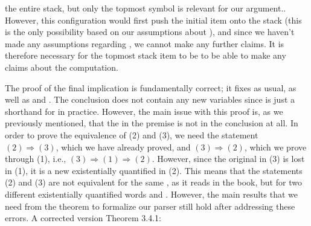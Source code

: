 \begin{isabellebody}
\begin{isamarkuptext}
{the entire stack, but only the topmost symbol is relevant for our argument.}. However, this 
configuration would first push the initial item  onto the stack (this is the 
only possibility based on our assumptions about ), and since we haven't made any assumptions 
regarding \isa{{\isasymalpha}}, we cannot make any further claims. It is therefore necessary for the topmost stack 
item to be  to be able to make any claims about the computation.

The proof of the final implication is fundamentally correct; it fixes  as 
usual, as well as \isa{{\isasymrho}} and . The conclusion does not contain any new variables since \isa{{\isasymgamma}} is just 
a shorthand for  in practice. However, the main issue with this proof is,
as we previously mentioned, that the  in the premise is not in the conclusion at all. In order 
to prove the equivalence of (2) and (3), we need the statement $(2) \Longrightarrow (3)$, which we have already
proved, and $(3) \Longrightarrow (2)$, which we prove through (1), i.e.,
$(3) \Longrightarrow (1) \Longrightarrow (2)$. However, since
the original  in (3) is lost in (1), it is a new existentially quantified  in (2). This means
that the statements (2) and (3) are not equivalent for the same , as it reads in the book, 
but for two different existentially quantified words  and . However, the 
main results that we need from the theorem to formalize our parser still hold after addressing 
these errors. A corrected version Theorem 3.4.1:


\end{isamarkuptext}
\end{isabellebody}
